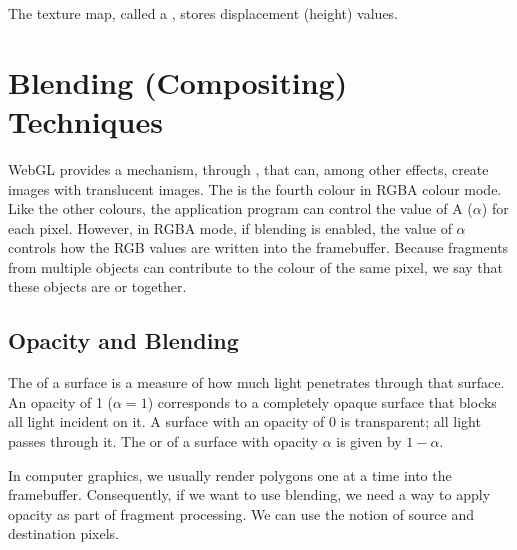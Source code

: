 \documentclass[../COS3712_Notes.tex]{subfiles}
\begin{document}
      The texture map, called a , stores displacement (height) values.

    \section{Blending (Compositing) Techniques}
      WebGL provides a mechanism, through ,
      that can, among other effects, create images with translucent images.
      The  is the fourth colour in RGBA colour mode.
      Like the other colours, the application program can control the value of A ($\alpha$)
      for each pixel.
      However, in RGBA mode, if blending is enabled, the value of $\alpha$ controls how the
      RGB values are written into the framebuffer.
      Because fragments from multiple objects can contribute to the colour of the same pixel,
      we say that these objects are  or  together.

      \subsection{Opacity and Blending}
        The  of a surface is a measure of how much light penetrates
        through that surface.
        An opacity of 1 ($\alpha = 1$) corresponds to a completely opaque surface
        that blocks all light incident on it.
        A surface with an opacity of 0 is transparent; all light passes through it.
        The  or  of a surface with opacity $\alpha$
        is given by $1 - \alpha$.

        In computer graphics, we usually render polygons one at a time into the framebuffer.
        Consequently, if we want to use blending, we need a way to apply opacity as part of
        fragment processing.
        We can use the notion of source and destination pixels.
\end{document}

